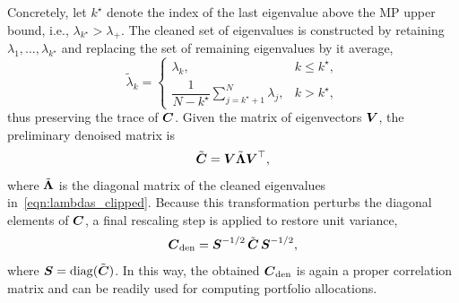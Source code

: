 \documentclass[pdflatex,sn-basic]{sn-jnl}%
\theoremstyle{thmstyleone}%
\theoremstyle{thmstyletwo}%
\theoremstyle{thmstylethree}%
\begin{document}
Concretely, let $k^{\star}$ denote the index of the last eigenvalue above the MP upper bound, i.e., $\lambda_{k^{\star}} > \lambda_{+}$. The cleaned set of eigenvalues is constructed by retaining $\lambda_1,\ldots,\lambda_{k^{\star}}$ and replacing the set of remaining eigenvalues by it average,
\begin{equation}
\label{eqn:lambdas_clipped}
    \tilde{\lambda}_k=
    \begin{cases}
    \lambda_k, & k \le k^{\star},\\
    \dfrac{1}{N-k^{\star}}\displaystyle\sum\limits_{j=k^{\star}+1}^{N}\lambda_j, & k>k^{\star},
    \end{cases}
\end{equation}
thus preserving the trace of $\boldsymbol{C}$.  Given the matrix of eigenvectors $\boldsymbol{V}$, the preliminary denoised matrix is
\begin{equation}
    \tilde{\boldsymbol{C}} = \boldsymbol{V}\tilde{\boldsymbol{\Lambda}}\boldsymbol{V}^\top,    
\end{equation}
where $\tilde{\boldsymbol{\Lambda}}$ is the diagonal matrix of the cleaned eigenvalues in~\eqref{eqn:lambdas_clipped}. Because this transformation perturbs the diagonal elements of $\boldsymbol{C}$, a final rescaling step is applied to restore unit variance,
\begin{equation}
\label{eqn:denoised_corr_mat}
    \boldsymbol{C}_{\mathrm{den}}
=
\boldsymbol{S}^{-1/2}
\,\tilde{\boldsymbol{C}}\,
\boldsymbol{S}^{-1/2},
\end{equation}
where $\boldsymbol{S} = \operatorname{diag}(\tilde{\boldsymbol{C}})$. In this way, the obtained $\boldsymbol{C}_{\mathrm{den}}$ is again a proper correlation matrix and can be readily used for computing portfolio allocations. 
\end{document}
